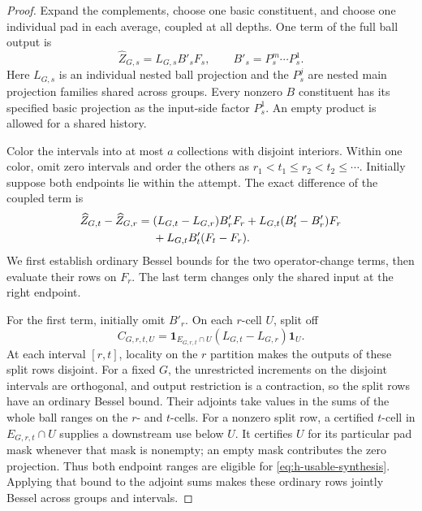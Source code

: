 \begin{proof}
Expand the complements, choose one basic constituent, and choose
one individual pad in each average, coupled at all depths.  One
term of the full ball output is
\begin{equation}
 \widehat Z_{G,s}=L_{G,s}B'_sF_s,\qquad
 B'_s=P_s^m\cdots P_s^1.
 \label{eq:h-current-product}
\end{equation}
Here \(L_{G,s}\) is an individual nested ball projection and the
\(P^j_s\) are nested main projection families shared across groups.
Every nonzero \(B\) constituent has its specified basic projection
as the input-side factor \(P_s^1\).  An empty product is allowed for
a shared history.

Color the intervals into at most \(a\) collections with disjoint
interiors.  Within one color, omit zero intervals and order the
others as \(r_1<t_1\le r_2<t_2\le\cdots\).  Initially suppose both
endpoints lie within the attempt.  The exact difference of the
coupled term is
\begin{align}
 \widehat Z_{G,t}-\widehat Z_{G,r}
 ={}&(L_{G,t}-L_{G,r})B'_rF_r
       +L_{G,t}(B'_t-B'_r)F_r \notag\\
    &+L_{G,t}B'_t(F_t-F_r).
 \label{eq:h-variation-decomposition}
\end{align}
We first establish ordinary Bessel bounds for the two
operator-change terms, then evaluate their rows on \(F_r\).  The
last term changes only the shared input at the right endpoint.

For the first term, initially omit \(B'_r\).  On each \(r\)-cell
\(U\), split off
\[
 C_{G,r,t,U}=\mathbf1_{E_{G,r,t}\cap U}
                 (L_{G,t}-L_{G,r})\mathbf1_U.
\]
At each interval \([r,t]\), locality on the \(r\) partition makes the outputs of these split
rows disjoint.  For a fixed \(G\), the unrestricted increments on
the disjoint intervals are orthogonal, and output restriction is a
contraction, so the split rows have an ordinary Bessel bound.
Their adjoints take values in the sums of the whole ball ranges on
the \(r\)- and \(t\)-cells.  For a nonzero split row, a certified
\(t\)-cell in \(E_{G,r,t}\cap U\) supplies a downstream use below
\(U\).  It certifies \(U\) for its particular pad mask whenever
that mask is nonempty; an empty mask contributes the zero
projection.  Thus both endpoint ranges are eligible for
\eqref{eq:h-usable-synthesis}.  Applying that bound to the adjoint
sums makes these ordinary rows jointly Bessel across groups and
intervals.


\end{proof}
